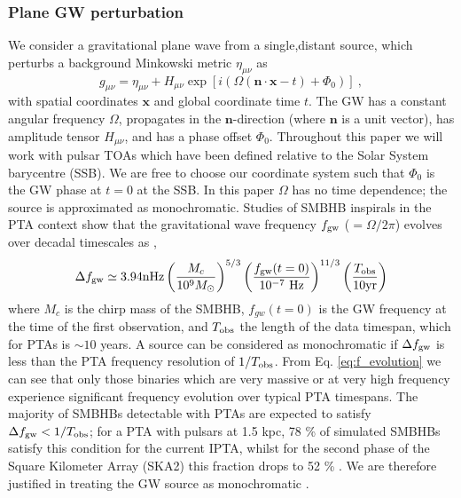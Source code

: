 \documentclass[fleqn,usenatbib,useAMS]{mnras}
\begin{document}
\subsubsection{Plane GW perturbation}
We consider a gravitational plane wave from a single,distant source, which perturbs a background Minkowski metric $\eta_{\mu \nu}$ as
\begin{equation}
	g_{\mu \nu} = \eta_{\mu \nu} + H_{\mu \nu} \exp{[i(\Omega(\boldsymbol{n} \cdot \boldsymbol{x} - t) + \Phi_0)]} \ ,
\end{equation}
with spatial coordinates $\boldsymbol{x}$ and global coordinate time $t$. The GW has a constant angular frequency $\Omega$, propagates in the $\boldsymbol{n}$-direction (where $\boldsymbol{n}$ is a unit vector), has amplitude tensor $H_{\mu \nu}$, and has a phase offset  $\Phi_0$. Throughout this paper we will work with pulsar TOAs which have been defined relative to the Solar System barycentre (SSB). We are free to choose our coordinate system such that $\Phi_0$ is the GW phase at $t=0$ at the SSB. In this paper $\Omega$ has no time dependence; the source is approximated as monochromatic. Studies of SMBHB inspirals in the PTA context show that the gravitational wave frequency $f_{\rm gw}$ ($=\Omega / 2 \pi $) evolves over decadal timescales as \citep[e.g.][]{Zhu10},
\begin{equation}
	\Delta f_{\rm gw} \simeq 3.94 \mathrm{nHz}\left(\frac{M_c}{10^9 M_{\odot}}\right)^{5 / 3}\left(\frac{f_{\rm gw}(t=0)}{10^{-7} \mathrm{~Hz}}\right)^{11 / 3}\left(\frac{T_{\mathrm{obs}}}{10 \mathrm{yr}}\right)
	\label{eq:f_evolution}
\end{equation}
where $M_c$ is the chirp mass of the SMBHB, $f_{gw}(t=0)$ is the GW frequency at the time of the first observation, and $T_{\rm obs}$ the length of the data timespan, which for PTAs is $\sim 10$ years. A source can be considered as monochromatic if $\Delta f_{\rm gw}$ is less than the PTA frequency resolution of $1/T_{\rm obs}$. From Eq. \ref{eq:f_evolution} we can see that only those binaries which are very massive or at very high frequency experience significant frequency evolution over typical PTA timespans. The majority of SMBHBs detectable with PTAs are expected to satisfy $\Delta f_{\rm gw} < 1/T_{\rm obs}$; for a PTA with pulsars at 1.5 kpc, 78 \% of simulated SMBHBs satisfy this condition for the current IPTA, whilst for the second phase of the Square Kilometer Array (SKA2) this fraction drops to 52 \% \citep[Fig 7 of ][]{Rosado10.1093/mnras/stv1098}. We are therefore justified in treating the GW source as monochromatic \citep{Sesana10,Sesana2010,Ellis2012ApJ}. \newline 
\end{document}
